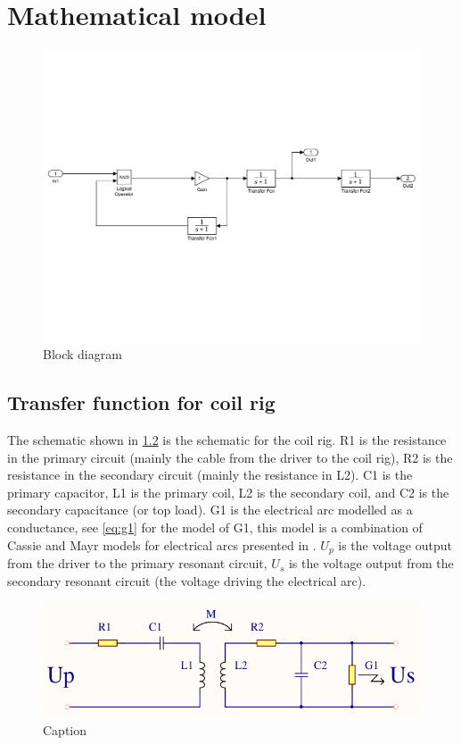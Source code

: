 \chapter{Mathematical model}

\begin{figure}[h!]
    \centering
    \includegraphics[width=\textwidth]{img/Simulink_transfer.pdf}
    \caption{Block diagram}
    \label{fig:spolerigg3}
\end{figure}

\section{Transfer function for coil rig}

The schematic shown in \cref{fig:spolerigg1} is the schematic for the coil rig. R1 is the resistance in the primary circuit (mainly the cable from the driver to the coil rig), R2 is the resistance in the secondary circuit (mainly the resistance in L2). C1 is the primary capacitor, L1 is the primary coil, L2 is the secondary coil, and C2 is the secondary capacitance (or top load). G1 is the electrical arc modelled as a conductance, see \cref{eq:g1} for the model of G1, this model is a combination of Cassie \citep{cassie} and Mayr \citep{mayr} models for electrical arcs presented in \citep{575670}. $U_p$ is the voltage output from the driver to the primary resonant circuit, $U_s$ is the voltage output from the secondary resonant circuit (the voltage driving the electrical arc).

\begin{figure}[h!]
    \centering
    \includegraphics[width=\textwidth]{Skjema/Spolerigg1.pdf}
    \caption{Caption}
    \label{fig:spolerigg1}
\end{figure}

